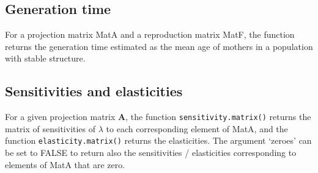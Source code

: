 \documentclass[
]{book}
\newenvironment{Shaded}{\begin{snugshade}}{\end{snugshade}}
\newcommand{\AttributeTok}[1]{\textcolor[rgb]{0.77,0.63,0.00}{#1}}
\newcommand{\ControlFlowTok}[1]{\textcolor[rgb]{0.13,0.29,0.53}{\textbf{#1}}}
\newcommand{\DecValTok}[1]{\textcolor[rgb]{0.00,0.00,0.81}{#1}}
\newcommand{\FunctionTok}[1]{\textcolor[rgb]{0.00,0.00,0.00}{#1}}
\newcommand{\NormalTok}[1]{#1}
\newcommand{\OtherTok}[1]{\textcolor[rgb]{0.56,0.35,0.01}{#1}}
\newcommand{\SpecialCharTok}[1]{\textcolor[rgb]{0.00,0.00,0.00}{#1}}
\begin{document}
\hypertarget{generation-time}{%
\subsection{Generation time}\label{generation-time}}

For a projection matrix MatA and a reproduction matrix MatF, the function returns the generation time estimated as the mean age of mothers in a population with stable structure.

\begin{Shaded}
\end{Shaded}

\hypertarget{sensitivities-and-elasticities}{%
\subsection{Sensitivities and elasticities}\label{sensitivities-and-elasticities}}

For a given projection matrix \(\mathbf{A}\), the function \texttt{sensitivity.matrix()} returns the matrix of sensitivities of \(\lambda\) to each corresponding element of MatA, and the function \texttt{elasticity.matrix()} returns the elasticities. The argument `zeroes' can be set to FALSE to return also the sensitivities / elasticities corresponding to elements of MatA that are zero.

\begin{Shaded}
\end{Shaded}
\end{document}

